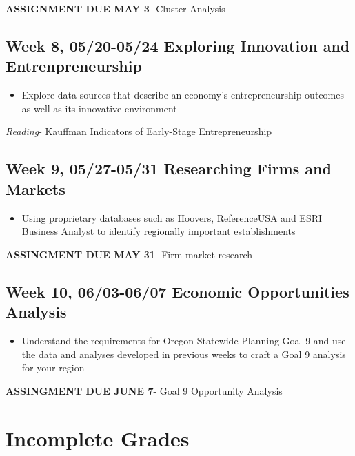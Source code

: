 \documentclass[11pt,]{article}
\providecommand{\tightlist}{%
  \setlength{\itemsep}{0pt}\setlength{\parskip}{0pt}}
\begin{document}
\textbf{ASSIGNMENT DUE MAY 3}- Cluster Analysis

\subsection{Week 8, 05/20-05/24 Exploring Innovation and
Entrenpreneurship}\label{week-8-0520-0524-exploring-innovation-and-entrenpreneurship}

\begin{itemize}
\tightlist
\item
  Explore data sources that describe an economy's entrepreneurship
  outcomes as well as its innovative environment
\end{itemize}

\emph{Reading}- \href{https://indicators.kauffman.org/}{Kauffman
Indicators of Early-Stage Entrepreneurship}

\subsection{Week 9, 05/27-05/31 Researching Firms and
Markets}\label{week-9-0527-0531-researching-firms-and-markets}

\begin{itemize}
\tightlist
\item
  Using proprietary databases such as Hoovers, ReferenceUSA and ESRI
  Business Analyst to identify regionally important establishments
\end{itemize}

\textbf{ASSINGMENT DUE MAY 31}- Firm market research

\subsection{Week 10, 06/03-06/07 Economic Opportunities
Analysis}\label{week-10-0603-0607-economic-opportunities-analysis}

\begin{itemize}
\tightlist
\item
  Understand the requirements for Oregon Statewide Planning Goal 9 and
  use the data and analyses developed in previous weeks to craft a Goal
  9 analysis for your region
\end{itemize}

\textbf{ASSINGMENT DUE JUNE 7}- Goal 9 Opportunity Analysis

\section{Incomplete Grades}\label{incomplete-grades}
\end{document}
